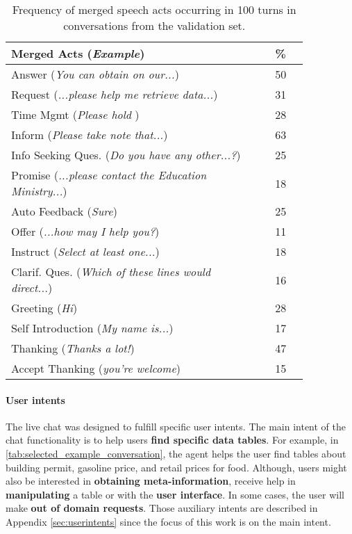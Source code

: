 \documentclass[11pt]{article}
\begin{document}
\begin{table}[t]
    \small
    \centering
    \begin{tabular}{p{0.85\linewidth} c}
        \toprule
\textbf{Merged Acts (\textit{Example})} & \textbf{\%} \\
\midrule
Answer                (\textit{You can obtain on our...}) & 50 \\
Request               (\textit{...please help me retrieve data...}) & 31 \\
Time Mgmt        (\textit{Please hold }) & 28 \\
Inform                (\textit{Please take note that...}) & 63 \\
Info Seeking Ques.  (\textit{Do you have any other...?}) & 25 \\
Promise               (\textit{...please contact the Education Ministry...}) & 18 \\
Auto Feedback          (\textit{Sure}) & 25 \\
Offer                 (\textit{...how may I help you?}) & 11 \\
Instruct              (\textit{Select at least one...}) & 18 \\
Clarif. Ques. (\textit{Which of these lines would direct...}) & 16 \\
Greeting              (\textit{Hi}) & 28 \\
Self Introduction      (\textit{My name is...}) & 17 \\
Thanking              (\textit{Thanks a lot!}) & 47 \\
Accept Thanking        (\textit{you're welcome}) & 15 \\
        \bottomrule
    \end{tabular}
    \caption{Frequency of merged speech acts occurring in 100 turns in conversations from the validation set.}
    \label{tab:merged_speech_act_counts}
\end{table}

\paragraph{User intents} The live chat was designed to fulfill specific user intents. The main intent of the chat functionality is to help users \textbf{find specific data tables}. For example, in \autoref{tab:selected_example_conversation}, the agent helps the user find tables about building permit, gasoline price, and retail prices for food. Although, users might also be interested in \textbf{obtaining meta-information}, receive help in \textbf{manipulating} a table or with the \textbf{user interface}. In some cases, the user will make \textbf{out of domain requests}. Those auxiliary intents are described in Appendix \ref{sec:userintents} since the focus of this work is on the main intent.
\end{document}
